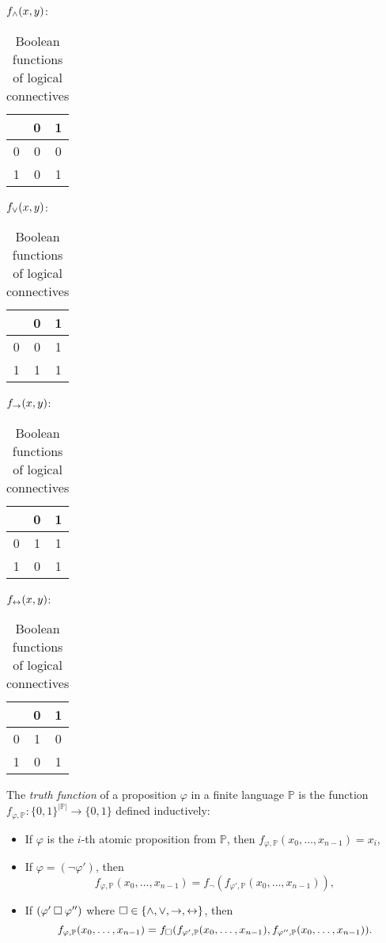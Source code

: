 \begin{table}
\centering
$f_{\land}(x,y)$:  
\begin{tabular}{c|cc}
      & 0 & 1  \\ \hline
    0 & 0 & 0  \\
    1 & 0 & 1 
\end{tabular}\quad
$f_{\lor}(x,y)$:         
\begin{tabular}{c|cc}
      & 0 & 1  \\ \hline
    0 & 0 & 1  \\
    1 & 1 & 1 
\end{tabular}\quad
$f_{\mathbin{\rightarrow}}(x,y)$:         
\begin{tabular}{c|cc}
      & 0 & 1  \\ \hline
    0 & 1 & 1  \\
    1 & 0 & 1 
\end{tabular}\quad
$f_{\mathbin{\leftrightarrow}}(x,y)$:         
\begin{tabular}{c|cc}
      & 0 & 1  \\ \hline
    0 & 1 & 0  \\
    1 & 0 & 1 
\end{tabular}
\caption{Boolean functions of logical connectives}
\label{table:boolean-functions-for-logical-connectives}    
\end{table}

\begin{definition}\label{definition:truth-function}
The \emph{truth function} of a proposition $\varphi$ in a finite language $\mathbb{P}$ is the function $f_{\varphi,\mathbb{P}}\colon\{0,1\}^{|\mathbb{P}|}\to\{0,1\}$ defined inductively:
\begin{itemize}
    \item If $\varphi$ is the $i$-th atomic proposition from $\mathbb{P}$, then $f_{\varphi,\mathbb{P}}(x_0,\dots,x_{n-1})=x_i$,
    \item If $\varphi = (\neg \varphi')$, then 
    $$
    f_{\varphi,\mathbb{P}}(x_0,\dots,x_{n-1}) = f_\neg(f_{\varphi',\mathbb{P}}(x_0,\dots,x_{n-1})),
    $$
    \item If $(\varphi' \mathbin{\square} \varphi'')$ where ${\mathbin{\square}} \in \{\land, \lor, \mathbin{\rightarrow}, \mathbin{\leftrightarrow}\}$, then 
    $$
    f_{\varphi,\mathbb{P}}(x_0,\dots,x_{n-1}) = f_{\mathbin{\square}}(f_{\varphi',\mathbb{P}}(x_0,\dots,x_{n-1}), f_{\varphi'',\mathbb{P}}(x_0,\dots,x_{n-1})).
    $$
\end{itemize}
\end{definition}

